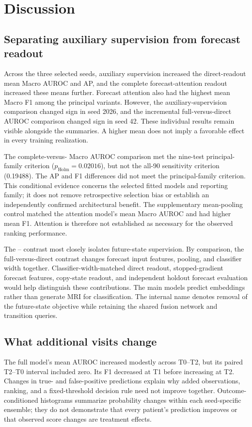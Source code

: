 \section{Discussion}
\label{sec:discussion}
\subsection{Separating auxiliary supervision from forecast readout}
Across the three selected seeds, auxiliary supervision increased the direct-readout mean Macro AUROC and AP, and the complete forecast-attention readout increased these means further. Forecast attention also had the highest mean Macro F1 among the principal variants. However, the auxiliary-supervision comparison changed sign in seed 2026, and the incremental full-versus-direct AUROC comparison changed sign in seed 42. These individual results remain visible alongside the summaries. A higher mean does not imply a favorable effect in every training realization.

The complete-versus-\nojepa{} Macro AUROC comparison met the nine-test principal-family criterion ($p_{\mathrm{Holm}}=0.02016$), but not the all-90 sensitivity criterion (0.19488). The AP and F1 differences did not meet the principal-family criterion. This conditional evidence concerns the selected fitted models and reporting family; it does not remove retrospective selection bias or establish an independently confirmed architectural benefit. The supplementary mean-pooling control matched the attention model's mean Macro AUROC and had higher mean F1. Attention is therefore not established as necessary for the observed ranking performance.

The \direct{}--\nojepa{} contrast most closely isolates future-state supervision. By comparison, the full-versus-direct contrast changes forecast input features, pooling, and classifier width together. Classifier-width-matched direct readout, stopped-gradient forecast features, copy-state readout, and independent holdout forecast evaluation would help distinguish these contributions. The main models predict embeddings rather than generate MRI for classification. The internal name \nojepa{} denotes removal of the future-state objective while retaining the shared fusion network and transition queries.

\subsection{What additional visits change}
The full model's mean AUROC increased modestly across T0--T2, but its paired T2--T0 interval included zero. Its F1 decreased at T1 before increasing at T2. Changes in true- and false-positive predictions explain why added observations, ranking, and a fixed-threshold decision rule need not improve together. Outcome-conditioned histograms summarize probability changes within each seed-specific ensemble; they do not demonstrate that every patient's prediction improves or that observed score changes are treatment effects.

